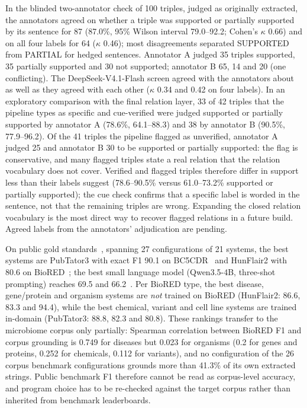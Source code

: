 \documentclass[referee,lineno,pdflatex,sn-vancouver-num]{sn-jnl}
\theoremstyle{thmstyleone}%
\theoremstyle{thmstyletwo}%
\theoremstyle{thmstylethree}%
\begin{document}
In the blinded two-annotator check of 100 triples, judged as originally
extracted, the annotators agreed on
whether a triple was supported or partially supported by its sentence for 87
(87.0\%, 95\% Wilson interval 79.0--92.2; Cohen's $\kappa$ 0.66) and on all four
labels for 64 ($\kappa$ 0.46); most disagreements separated SUPPORTED from
PARTIAL for hedged sentences. Annotator A judged 35 triples supported, 35
partially supported and 30 not supported; annotator B 65, 14 and 20 (one
conflicting). The DeepSeek-V4.1-Flash screen agreed with the annotators about
as well as they agreed with each other ($\kappa$ 0.34 and 0.42 on four
labels). In an exploratory comparison with the final relation layer, 33 of 42
triples that the pipeline types as specific and cue-verified were judged
supported or partially supported by annotator A (78.6\%, 64.1--88.3) and 38
by annotator B (90.5\%, 77.9--96.2). Of the 41 triples the pipeline flagged
as unverified, annotator A judged 25 and annotator B 30 to be supported or
partially supported: the flag is conservative, and many flagged triples state
a real relation that the relation vocabulary does not cover. Verified and
flagged triples therefore differ in support less than their labels suggest
(78.6--90.5\% versus 61.0--73.2\% supported or partially supported); the cue
check confirms that a specific label is worded in the sentence, not that the
remaining triples are wrong. Expanding the closed relation vocabulary is the
most direct way to recover flagged relations in a future build. Agreed labels
from the annotators' adjudication are pending.

On public gold standards~\cite{li2016bc5cdr,luo2022biored}, spanning
27 configurations of 21 systems, the best systems are PubTator3 with
exact F1 90.1 on BC5CDR~\cite{wei2024pubtator3} and HunFlair2 with
80.6 on BioRED~\cite{sanger2024hunflair2}; the best small language
model (Qwen3.5-4B, three-shot prompting) reaches 69.5 and
66.2~\cite{qwen35card}. Per BioRED type, the best disease, gene/protein
and organism systems are {\em not} trained on BioRED (HunFlair2:
86.6, 83.3 and 94.4), while the best chemical, variant and cell line
systems are trained in-domain (PubTator3: 88.8, 82.3 and 80.8).
These rankings transfer to the microbiome corpus only partially:
Spearman correlation between BioRED F1 and corpus grounding is 0.749
for diseases but 0.023 for organisms (0.2 for genes and proteins, 0.252
for chemicals, 0.112 for variants), and no configuration of the 26
corpus benchmark configurations grounds more than 41.3\% of its own
extracted strings. Public benchmark F1 therefore cannot be read as
corpus-level accuracy, and program choice has to be re-checked against
the target corpus rather than inherited from benchmark leaderboards.
\end{document}
